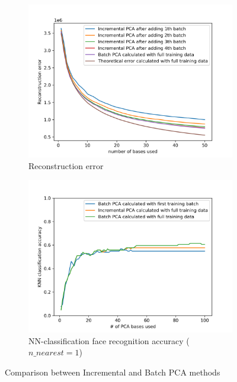 \begin{figure}[htbp]
	\begin{subfigure}{0.48\linewidth}
		\centering
		\includegraphics[width=\linewidth]{image/q2-fig3.png}
		\caption{Reconstruction error}
		\label{fig:q2-fig3}
	\end{subfigure}
	\hfill
	\begin{subfigure}{0.48\linewidth}
		\centering
		\includegraphics[width=\linewidth]{image/q2-fig4.png}
		\caption{NN-classification face recognition accuracy ($n\_nearest=1$)}
		\label{fig:q2-fig4}
	\end{subfigure}
	\caption{Comparison between Incremental and Batch PCA methods}
	\label{fig:q2}
\end{figure}
\vspace{-0.5cm}